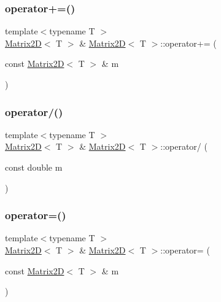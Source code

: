 \mbox{\label{classMatrix2D_a05b92232d9a5e7b76c4d4c1508ae2e12}} 
\subsubsection{\texorpdfstring{operator+=()}{operator+=()}}
{\footnotesize\ttfamily template$<$typename T $>$ \\
\mbox{\hyperlink{classMatrix2D}{Matrix2D}}$<$ T $>$ \& \mbox{\hyperlink{classMatrix2D}{Matrix2D}}$<$ T $>$\+::operator+= (\begin{DoxyParamCaption}\item[{const \mbox{\hyperlink{classMatrix2D}{Matrix2D}}$<$ T $>$ \&}]{m }\end{DoxyParamCaption})}

\mbox{\label{classMatrix2D_a48122f2fa79bf511d0c4e143dcdb0cf0}} 
\subsubsection{\texorpdfstring{operator/()}{operator/()}}
{\footnotesize\ttfamily template$<$typename T $>$ \\
\mbox{\hyperlink{classMatrix2D}{Matrix2D}}$<$ T $>$ \& \mbox{\hyperlink{classMatrix2D}{Matrix2D}}$<$ T $>$\+::operator/ (\begin{DoxyParamCaption}\item[{const double}]{m }\end{DoxyParamCaption})}

\mbox{\label{classMatrix2D_a17597829237784fa6089a23b7accb631}} 
\subsubsection{\texorpdfstring{operator=()}{operator=()}}
{\footnotesize\ttfamily template$<$typename T $>$ \\
\mbox{\hyperlink{classMatrix2D}{Matrix2D}}$<$ T $>$ \& \mbox{\hyperlink{classMatrix2D}{Matrix2D}}$<$ T $>$\+::operator= (\begin{DoxyParamCaption}\item[{const \mbox{\hyperlink{classMatrix2D}{Matrix2D}}$<$ T $>$ \&}]{m }\end{DoxyParamCaption})}

